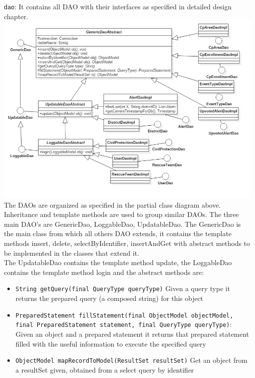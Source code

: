 \documentclass[a4paper,12pt]{report}
\begin{document}
\texttt{dao}: It contains all DAO with their interfaces as specified in detailed design chapter.\\
\includegraphics[width=\textwidth]{figures/ClassDiagram.jpg}
The DAOs are organized as specified in the partial class diagram above. Inheritance and template methods are used to group similar DAOs. The three main DAO's are GenericDao, LoggableDao, UpdatableDao. The GenericDao is the main class from which all others DAO extends, it contains the template methods insert, delete, selectByIdentifier, insertAndGet with abstract methods to be implemented in the classes that extend it.\\
The UpdatableDao contains the template method update, the LoggableDao contains the template method login and the abstract methods are:
\begin{itemize}
\item \texttt{String getQuery(final QueryType queryType)} Given a query type it returns the prepared query (a composed string) for this object
\item \texttt{PreparedStatement fillStatement(final ObjectModel objectModel, \\final PreparedStatement statement, final QueryType queryType)}: Given an object and a prepared statement it returns that prepared statement filled with the useful information to execute the specified query
\item \texttt{ObjectModel mapRecordToModel(ResultSet resultSet)} Get an object from a resultSet given, obtained from a select query by identifier
\end{itemize}
\end{document}
